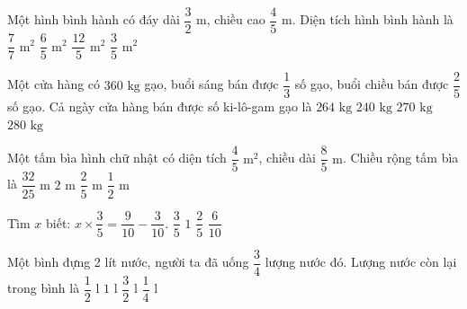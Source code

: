 \begin{ex} %
Một hình bình hành có đáy dài $\dfrac{3}{2}\text{ m}$, chiều cao $\dfrac{4}{5}\text{ m}$. Diện tích hình bình hành là
\choice
{$\dfrac{7}{7}\text{ m}^2$}
{\True $\dfrac{6}{5}\text{ m}^2$}
{$\dfrac{12}{5}\text{ m}^2$}
{$\dfrac{3}{5}\text{ m}^2$}
\end{ex}

\begin{ex} %
Một cửa hàng có $360\text{ kg}$ gạo, buổi sáng bán được $\dfrac{1}{3}$ số gạo, buổi chiều bán được $\dfrac{2}{5}$ số gạo. Cả ngày cửa hàng bán được số ki-lô-gam gạo là
\choice
{\True $264\text{ kg}$}
{$240\text{ kg}$}
{$270\text{ kg}$}
{$280\text{ kg}$}
\end{ex}

\begin{ex} %
Một tấm bìa hình chữ nhật có diện tích $\dfrac{4}{5}\text{ m}^2$, chiều dài $\dfrac{8}{5}\text{ m}$. Chiều rộng tấm bìa là
\choice
{$\dfrac{32}{25}\text{ m}$}
{$2\text{ m}$}
{$\dfrac{2}{5}\text{ m}$}
{\True $\dfrac{1}{2}\text{ m}$}
\end{ex}

\begin{ex} %
Tìm $x$ biết: $x \times \dfrac{3}{5} = \dfrac{9}{10} - \dfrac{3}{10}$.
\choice
{$\dfrac{3}{5}$}
{\True $1$}
{$\dfrac{2}{5}$}
{$\dfrac{6}{10}$}
\end{ex}

\begin{ex} %
Một bình đựng 2 lít nước, người ta đã uống $\dfrac{3}{4}$ lượng nước đó. Lượng nước còn lại trong bình là
\choice
{\True $\dfrac{1}{2}\text{ l}$}
{$1\text{ l}$}
{$\dfrac{3}{2}\text{ l}$}
{$\dfrac{1}{4}\text{ l}$}
\end{ex}

